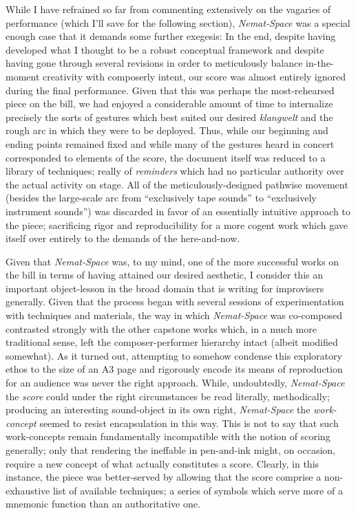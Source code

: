     While I have refrained so far from commenting extensively on the vagaries of performance (which I'll save for the following section), \textit{Nemat-Space} was a special enough case that it demands some further exegesis: In the end, despite having developed what I thought to be a robust conceptual framework and despite having gone through several revisions in order to meticulously balance in-the-moment creativity with composerly intent, our score was almost entirely ignored during the final performance. Given that this was perhaps the most-rehearsed piece on the bill, we had enjoyed a considerable amount of time to internalize precisely the sorts of gestures which best suited our desired \textit{klangwelt} and the rough arc in which they were to be deployed. Thus, while our beginning and ending points remained fixed and while many of the gestures heard in concert corresponded to elements of the score, the document itself was reduced to a library of techniques; really of \textit{reminders} which had no particular authority over the actual activity on stage. All of the meticulously-designed pathwise movement (besides the large-scale arc from ``exclusively tape sounds'' to ``exclusively instrument sounds'') was discarded in favor of an essentially intuitive approach to the piece; sacrificing rigor and reproducibility for a more cogent work which gave itself over entirely to the demands of the here-and-now.
    
    Given that \textit{Nemat-Space} was, to my mind, one of the more successful works on the bill in terms of having attained our desired aesthetic, I consider this an important object-lesson in the broad domain that is writing for improvisers generally. Given that the process began with several sessions of experimentation with techniques and materials, the way in which \textit{Nemat-Space} was co-composed contrasted strongly with the other capstone works which, in a much more traditional sense, left the composer-performer hierarchy intact (albeit modified somewhat). As it turned out, attempting to somehow condense this exploratory ethos to the size of an A3 page and rigorously encode its means of reproduction for an audience was never the right approach. While, undoubtedly, \textit{Nemat-Space} the \textit{score} could under the right circumstances be read literally, methodically; producing an interesting sound-object in its own right, \textit{Nemat-Space} the \textit{work-concept} seemed to resist encapsulation in this way. This is not to say that such work-concepts remain fundamentally incompatible with the notion of scoring generally; only that rendering the ineffable in pen-and-ink might, on occasion, require a new concept of what actually constitutes a score. Clearly, in this instance, the piece was better-served by allowing that the score comprise a non-exhaustive list of available techniques; a series of symbols which serve more of a mnemonic function than an authoritative one. 
    
